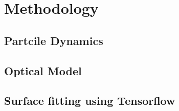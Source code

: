 \section{Methodology}
\label{sec:methodology}

\subsection{Partcile Dynamics}

\subsection{Optical Model}



\subsection{Surface fitting using Tensorflow}
